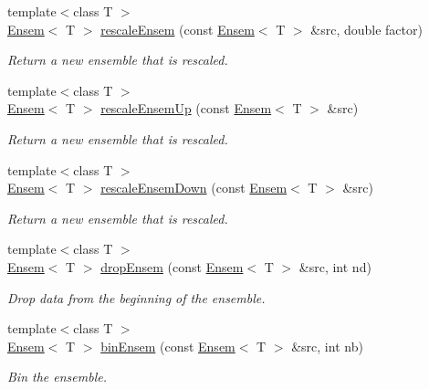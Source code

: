 \begin{DoxyCompactItemize}
{\footnotesize template$<$class T $>$ }\\\mbox{\hyperlink{classENSEM_1_1Ensem}{Ensem}}$<$ T $>$ \mbox{\hyperlink{group__eensem_gadbb88f64cff72d8d368551b6de6753f9}{rescale\+Ensem}} (const \mbox{\hyperlink{classENSEM_1_1Ensem}{Ensem}}$<$ T $>$ \&src, double factor)
\begin{DoxyCompactList}\small\item\em Return a new ensemble that is rescaled. \end{DoxyCompactList}\item 
{\footnotesize template$<$class T $>$ }\\\mbox{\hyperlink{classENSEM_1_1Ensem}{Ensem}}$<$ T $>$ \mbox{\hyperlink{group__eensem_ga30c22a7d0685364385ca870e38bd9b3b}{rescale\+Ensem\+Up}} (const \mbox{\hyperlink{classENSEM_1_1Ensem}{Ensem}}$<$ T $>$ \&src)
\begin{DoxyCompactList}\small\item\em Return a new ensemble that is rescaled. \end{DoxyCompactList}\item 
{\footnotesize template$<$class T $>$ }\\\mbox{\hyperlink{classENSEM_1_1Ensem}{Ensem}}$<$ T $>$ \mbox{\hyperlink{group__eensem_gae1ec6cc73aa72bf1f07360fa333487fe}{rescale\+Ensem\+Down}} (const \mbox{\hyperlink{classENSEM_1_1Ensem}{Ensem}}$<$ T $>$ \&src)
\begin{DoxyCompactList}\small\item\em Return a new ensemble that is rescaled. \end{DoxyCompactList}\item 
{\footnotesize template$<$class T $>$ }\\\mbox{\hyperlink{classENSEM_1_1Ensem}{Ensem}}$<$ T $>$ \mbox{\hyperlink{group__eensem_gae6658352073b607eb80030d2c69e5383}{drop\+Ensem}} (const \mbox{\hyperlink{classENSEM_1_1Ensem}{Ensem}}$<$ T $>$ \&src, int nd)
\begin{DoxyCompactList}\small\item\em Drop data from the beginning of the ensemble. \end{DoxyCompactList}\item 
{\footnotesize template$<$class T $>$ }\\\mbox{\hyperlink{classENSEM_1_1Ensem}{Ensem}}$<$ T $>$ \mbox{\hyperlink{group__eensem_ga26ac0e4150e2c67b69a13b6965beb29f}{bin\+Ensem}} (const \mbox{\hyperlink{classENSEM_1_1Ensem}{Ensem}}$<$ T $>$ \&src, int nb)
\begin{DoxyCompactList}\small\item\em Bin the ensemble. \end{DoxyCompactList}\item 

\end{DoxyCompactItemize}
